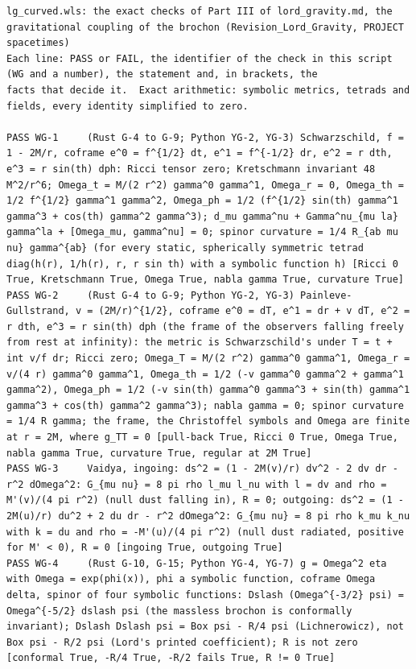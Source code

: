 \documentclass[
  10pt,
]{article}
\begin{document}
\begin{verbatim}
lg_curved.wls: the exact checks of Part III of lord_gravity.md, the gravitational coupling of the brochon (Revision_Lord_Gravity, PROJECT spacetimes)
Each line: PASS or FAIL, the identifier of the check in this script (WG and a number), the statement and, in brackets, the
facts that decide it.  Exact arithmetic: symbolic metrics, tetrads and fields, every identity simplified to zero.

PASS WG-1     (Rust G-4 to G-9; Python YG-2, YG-3) Schwarzschild, f = 1 - 2M/r, coframe e^0 = f^{1/2} dt, e^1 = f^{-1/2} dr, e^2 = r dth, e^3 = r sin(th) dph: Ricci tensor zero; Kretschmann invariant 48 M^2/r^6; Omega_t = M/(2 r^2) gamma^0 gamma^1, Omega_r = 0, Omega_th = 1/2 f^{1/2} gamma^1 gamma^2, Omega_ph = 1/2 (f^{1/2} sin(th) gamma^1 gamma^3 + cos(th) gamma^2 gamma^3); d_mu gamma^nu + Gamma^nu_{mu la} gamma^la + [Omega_mu, gamma^nu] = 0; spinor curvature = 1/4 R_{ab mu nu} gamma^{ab} (for every static, spherically symmetric tetrad diag(h(r), 1/h(r), r, r sin th) with a symbolic function h) [Ricci 0 True, Kretschmann True, Omega True, nabla gamma True, curvature True]
PASS WG-2     (Rust G-4 to G-9; Python YG-2, YG-3) Painleve-Gullstrand, v = (2M/r)^{1/2}, coframe e^0 = dT, e^1 = dr + v dT, e^2 = r dth, e^3 = r sin(th) dph (the frame of the observers falling freely from rest at infinity): the metric is Schwarzschild's under T = t + int v/f dr; Ricci zero; Omega_T = M/(2 r^2) gamma^0 gamma^1, Omega_r = v/(4 r) gamma^0 gamma^1, Omega_th = 1/2 (-v gamma^0 gamma^2 + gamma^1 gamma^2), Omega_ph = 1/2 (-v sin(th) gamma^0 gamma^3 + sin(th) gamma^1 gamma^3 + cos(th) gamma^2 gamma^3); nabla gamma = 0; spinor curvature = 1/4 R gamma; the frame, the Christoffel symbols and Omega are finite at r = 2M, where g_TT = 0 [pull-back True, Ricci 0 True, Omega True, nabla gamma True, curvature True, regular at 2M True]
PASS WG-3     Vaidya, ingoing: ds^2 = (1 - 2M(v)/r) dv^2 - 2 dv dr - r^2 dOmega^2: G_{mu nu} = 8 pi rho l_mu l_nu with l = dv and rho = M'(v)/(4 pi r^2) (null dust falling in), R = 0; outgoing: ds^2 = (1 - 2M(u)/r) du^2 + 2 du dr - r^2 dOmega^2: G_{mu nu} = 8 pi rho k_mu k_nu with k = du and rho = -M'(u)/(4 pi r^2) (null dust radiated, positive for M' < 0), R = 0 [ingoing True, outgoing True]
PASS WG-4     (Rust G-10, G-15; Python YG-4, YG-7) g = Omega^2 eta with Omega = exp(phi(x)), phi a symbolic function, coframe Omega delta, spinor of four symbolic functions: Dslash (Omega^{-3/2} psi) = Omega^{-5/2} dslash psi (the massless brochon is conformally invariant); Dslash Dslash psi = Box psi - R/4 psi (Lichnerowicz), not Box psi - R/2 psi (Lord's printed coefficient); R is not zero [conformal True, -R/4 True, -R/2 fails True, R != 0 True]

\end{verbatim}
\end{document}
